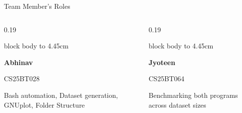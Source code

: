 \documentclass[aspectratio=169,11pt]{beamer}
\begin{document}

\begin{frame}{Team Member's Roles}

\begin{columns}[T,onlytextwidth]

\begin{column}{0.19\textwidth}
\begin{beamercolorbox}[
  wd=\linewidth,
  ht=4.65cm,
  dp=0cm,
  center,
  sep=0.08cm
]{block body}
\vbox to 4.45cm{
\centering
\vspace{0.05cm}


\vspace{0.15cm}
{\bfseries Abhinav}

\vspace{0.08cm}
{\scriptsize CS25BT028}

\vspace{0.25cm}
\parbox[t][1.65cm][t]{\linewidth}{
\centering\scriptsize
Bash automation, Dataset generation,
GNUplot, Folder Structure
}
\vfill
}
\end{beamercolorbox}
\end{column}


\begin{column}{0.19\textwidth}
\begin{beamercolorbox}[
  wd=\linewidth,
  ht=4.65cm,
  dp=0cm,
  center,
  sep=0.08cm
]{block body}
\vbox to 4.45cm{
\centering
\vspace{0.05cm}


\vspace{0.15cm}
{\bfseries Jyoteen}

\vspace{0.08cm}
{\scriptsize CS25BT064}

\vspace{0.25cm}
\parbox[t][1.65cm][t]{\linewidth}{
\centering\scriptsize
Benchmarking both programs across dataset sizes}
\vfill
}
\end{beamercolorbox}
\end{column}



\end{columns}
\end{frame}
\end{document}
